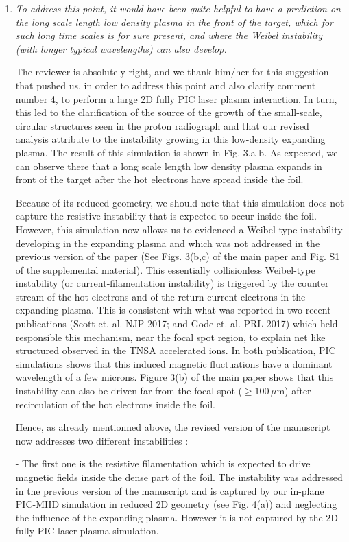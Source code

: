 \documentclass{article}
\begin{document}
\begin{enumerate}
\item \textit{To address this point, it would have been quite helpful to have a prediction on the long scale length low density plasma in the front of the target, which for such long time scales is for sure present, and where the Weibel instability (with longer typical wavelengths) can also develop. }

The reviewer is absolutely right, and we thank him/her for this suggestion that pushed us, in order to address this point and also clarify comment number 4, to perform a large 2D fully  PIC laser plasma interaction. In turn, this led to the clarification of the source of the growth of the small-scale, circular structures seen in the proton radiograph and that our revised analysis attribute to the instability growing in this low-density expanding plasma.
The result of this simulation is shown in Fig. 3.a-b. As expected, we can observe there that a long scale length low density plasma expands in front of the target after the hot electrons have spread inside the foil.

Because of its reduced geometry, we should note that this simulation does not capture the resistive instability that is expected to occur inside the foil. However, this simulation now allows us to evidenced a Weibel-type instability developing in the expanding plasma and which  was not addressed in the previous version of the paper (See Figs. 3(b,c) of the main paper and Fig. S1 of the supplemental material).
This essentially collisionless Weibel-type instability (or current-filamentation instability) is triggered by the counter stream of the hot electrons and of the  return current electrons in the expanding plasma. 
This is consistent with what was reported in two recent publications (Scott et. al. NJP 2017; and Gode et. al. PRL 2017) which  held responsible this mechanism, near the focal spot region, to explain net like structured observed in the TNSA accelerated ions. In both publication, PIC simulations shows that this induced magnetic fluctuations  have a dominant wavelength of a few microns.
Figure 3(b) of the main paper shows that this instability can also be driven far from the focal spot ($\ge 100\, \mu$m) after recirculation of the hot electrons  inside the foil.

Hence, as already mentionned above, the revised version of the manuscript now addresses two different instabilities :

- The first one is the resistive filamentation which is expected to drive magnetic fields inside the dense part of the foil. The instability was addressed in the previous version of the manuscript and is captured by our in-plane PIC-MHD simulation in reduced 2D geometry (see Fig. 4(a)) and neglecting the influence of the expanding plasma. However it is not captured by the 2D fully PIC laser-plasma simulation.


\end{enumerate}
\end{document}
